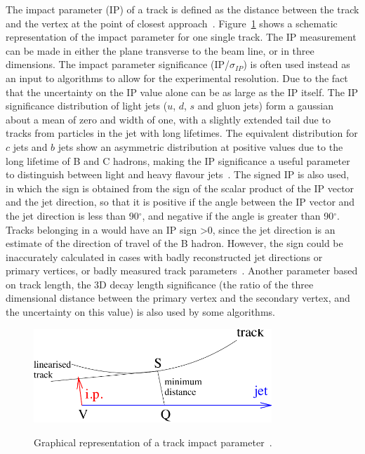 The impact parameter (IP) of a track is defined as the distance between the track and the vertex at the point
of closest approach~\cite{CMS-PAS-BTV-09-001}. Figure~\ref{fig:impact_parameter} shows a schematic
representation of the impact parameter for one single track. The IP measurement can be made in either the
plane transverse to the beam line, or in three dimensions. The impact parameter significance
(IP/$\sigma_{IP}$) is often used instead as an input to \btagging algorithms to allow for the experimental
resolution. Due to the fact that the uncertainty on the IP value alone can be as large as the IP itself. The
IP significance distribution of light jets ($u$, $d$, $s$ and gluon jets) form a gaussian about a mean of zero
and width of one, with a slightly extended tail due to tracks from particles in the jet with long lifetimes.
The equivalent distribution for $c$ jets and $b$ jets show an asymmetric distribution at positive values due
to the long lifetime of B and C hadrons, making the IP significance a useful parameter to distinguish between
light and heavy flavour jets~\cite{CMS-AN-2005-041}. The signed IP is also used, in which the sign is obtained
from the sign of the scalar product of the IP vector and the jet direction, so that it is positive if the
angle between the IP vector and the jet direction is less than 90$^{\circ}$, and negative if the angle is
greater than 90$^{\circ}$. Tracks belonging in a \bjet would have an IP sign >0, since the jet direction is an
estimate of the direction of travel of the B hadron. However, the sign could be inaccurately calculated in
cases with badly reconstructed jet directions or primary vertices, or badly measured track
parameters~\cite{CMS-AN-2005-041}. Another parameter based on track length, the 3D decay length significance
(the ratio of the three dimensional distance between the primary vertex and the secondary vertex, and the
uncertainty on this value) is also used by some \btagging algorithms.

\begin{figure}[hbtp]
   \centering
     \includegraphics[width=0.8\textwidth]{Chapters/04_Analysis/04a_BTags/Images/impact_parameter}\\
     \caption[Graphical representation of a track impact parameter.]{Graphical representation of a track
     impact parameter~\cite{CMS-PAS-BTV-09-001}.}
     \label{fig:impact_parameter}
\end{figure}

